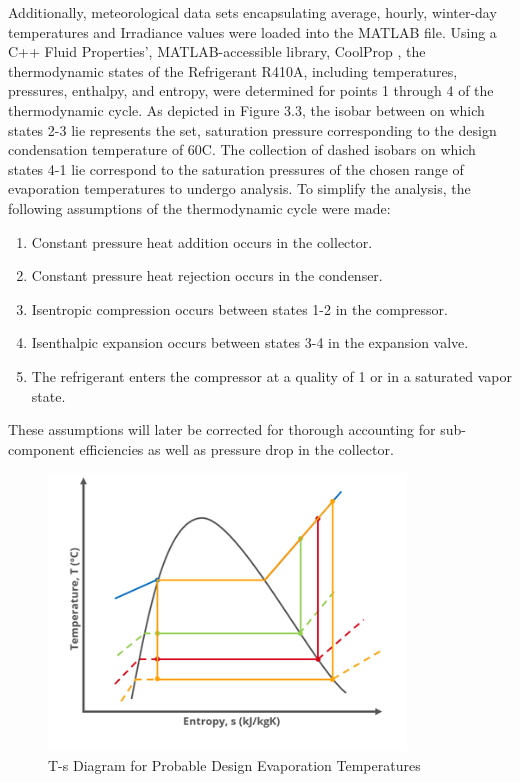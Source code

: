 \medskip
Additionally, meteorological data sets encapsulating average, hourly, winter-day temperatures and Irradiance values were loaded into the MATLAB \cite{MATLAB} file. Using a C++ Fluid Properties’, MATLAB-accessible library, CoolProp \cite{cool_prop}, the thermodynamic states of the Refrigerant R410A, including temperatures, pressures, enthalpy, and entropy, were determined for points 1 through 4 of the thermodynamic cycle. As depicted in Figure 3.3, the isobar between on which states 2-3 lie represents the set, saturation pressure corresponding to the design condensation temperature of 60\textdegree C. The collection of dashed isobars on which states 4-1 lie correspond to the saturation pressures of the chosen range of evaporation temperatures to undergo analysis. To simplify the analysis, the following assumptions of the thermodynamic cycle were made:

\newpage
\begin{enumerate}[itemsep=3mm, parsep=-1mm, label=\roman*.]
    \item Constant pressure heat addition occurs in the collector.
    \item Constant pressure heat rejection occurs in the condenser.
    \item Isentropic compression occurs between states 1-2 in the compressor.
    \item Isenthalpic expansion occurs between states 3-4 in the expansion valve.
    \item The refrigerant enters the compressor at a quality of 1 or in a saturated vapor state.
\end{enumerate}

\medskip
These assumptions will later be corrected for thorough accounting for sub-component efficiencies as well as pressure drop in the collector.

\medskip
\begin{figure}[H]
    \centering
    \includegraphics[width=9.5cm]{images/ts_diagram.png}
    \caption{T-s Diagram for Probable Design Evaporation Temperatures}
\end{figure}

